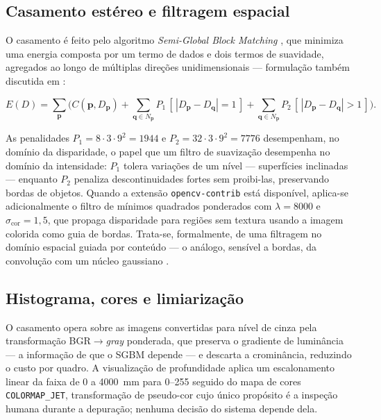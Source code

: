 \documentclass[12pt]{article}
\begin{document}
\subsection{Casamento estéreo e filtragem espacial}

O casamento é feito pelo algoritmo \textit{Semi-Global Block Matching}
\cite{hirschmuller2008}, que minimiza uma energia composta por um termo de
dados e dois termos de suavidade, agregados ao longo de múltiplas direções
unidimensionais --- formulação também discutida em \cite{szeliski2022}:

\begin{equation}
E(D) = \sum_{\mathbf{p}} \Big( C(\mathbf{p}, D_{\mathbf{p}})
+ \sum_{\mathbf{q} \in N_{\mathbf{p}}} P_1\,[\,|D_{\mathbf{p}} - D_{\mathbf{q}}| = 1\,]
+ \sum_{\mathbf{q} \in N_{\mathbf{p}}} P_2\,[\,|D_{\mathbf{p}} - D_{\mathbf{q}}| > 1\,] \Big).
\end{equation}

As penalidades $P_1 = 8 \cdot 3 \cdot 9^2 = 1944$ e
$P_2 = 32 \cdot 3 \cdot 9^2 = 7776$ desempenham, no domínio da disparidade, o
papel que um filtro de suavização desempenha no domínio da intensidade: $P_1$
tolera variações de um nível --- superfícies inclinadas --- enquanto $P_2$
penaliza descontinuidades fortes sem proibi-las, preservando bordas de
objetos. Quando a extensão \texttt{opencv-contrib} está disponível, aplica-se
adicionalmente o filtro de mínimos quadrados ponderados
\cite{min2013} com $\lambda = 8000$ e $\sigma_{\text{cor}} = 1{,}5$, que
propaga disparidade para regiões sem textura usando a imagem colorida como
guia de bordas. Trata-se, formalmente, de uma filtragem no domínio espacial
guiada por conteúdo --- o análogo, sensível a bordas, da convolução com um
núcleo gaussiano \cite{gonzalez2018}.

\subsection{Histograma, cores e limiarização}

O casamento opera sobre as imagens convertidas para nível de cinza pela
transformação BGR$\rightarrow$\textit{gray} ponderada, que preserva o
gradiente de luminância --- a informação de que o SGBM depende --- e descarta a
crominância, reduzindo o custo por quadro. A visualização de profundidade
aplica um escalonamento linear da faixa de 0 a 4000~mm para 0--255 seguido do
mapa de cores \texttt{COLORMAP\_JET}, transformação de pseudo-cor cujo único
propósito é a inspeção humana durante a depuração; nenhuma decisão do sistema
depende dela.
\end{document}
